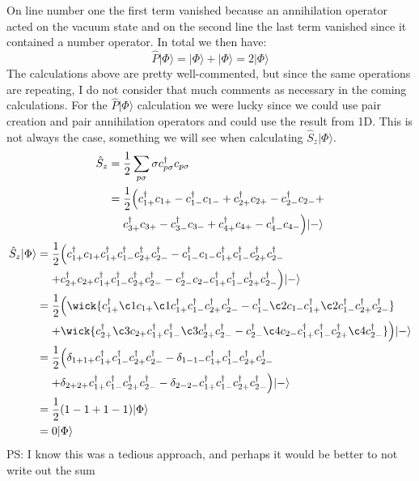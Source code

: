 \documentclass[norsk,a4paper,12pt]{article}
\begin{document}
On line number one the first term vanished because an annihilation operator acted on the vacuum state and on the second line the last term vanished since it contained a number operator. In total we then have:
\begin{equation}
\hat{P}|\Phi\rangle=|\Phi\rangle+|\Phi\rangle=2|\Phi\rangle
\end{equation}
The calculations above are pretty well-commented, but since the same operations are repeating, I do not consider that much comments as necessary in the coming calculations. For the $\hat{P}|\Phi\rangle$ calculation we were lucky since we could use pair creation and pair annihilation operators and could use the result from 1D. This is not always the case, something we will see when calculating $\hat{S}_z|\Phi\rangle$.
\begin{align*}
\hat{S}_z&=\frac{1}{2}\sum_{p\sigma}\sigma c_{p\sigma}^{\dagger}c_{p\sigma}\\
&=\frac{1}{2}\Big(c_{1+}^{\dagger}c_{1+}-c_{1-}^{\dagger}c_{1-}+c_{2+}^{\dagger}c_{2+}-c_{2-}^{\dagger}c_{2-}+\notag\\
&\mathrel{\phantom{=}}c_{3+}^{\dagger}c_{3+}-c_{3-}^{\dagger}c_{3-}+c_{4+}^{\dagger}c_{4+}-c_{4-}^{\dagger}c_{4-}\Big)|-\rangle
\end{align*}
\begin{align}
\hat{S}_z|\Phi\rangle
&=\frac{1}{2}\Big(c_{1+}^{\dagger}c_{1+}c_{1+}^{\dagger}c_{1-}^{\dagger}c_{2+}^{\dagger}c_{2-}^{\dagger}-c_{1-}^{\dagger}c_{1-}c_{1+}^{\dagger}c_{1-}^{\dagger}c_{2+}^{\dagger}c_{2-}^{\dagger}\notag\\
&\mathrel{\phantom{=}}+c_{2+}^{\dagger}c_{2+}c_{1+}^{\dagger}c_{1-}^{\dagger}c_{2+}^{\dagger}c_{2-}^{\dagger}-c_{2-}^{\dagger}c_{2-}c_{1+}^{\dagger}c_{1-}^{\dagger}c_{2+}^{\dagger}c_{2-}^{\dagger}\Big)|-\rangle\notag\\
&=\frac{1}{2}\Big(\wick{c_{1+}^{\dagger}\c1 c_{1+}\c1 c_{1+}^{\dagger}c_{1-}^{\dagger}c_{2+}^{\dagger}c_{2-}^{\dagger}-c_{1-}^{\dagger}\c2 c_{1-}c_{1+}^{\dagger}\c2 c_{1-}^{\dagger}c_{2+}^{\dagger}c_{2-}^{\dagger}}\notag\\
&\mathrel{\phantom{=}}+\wick{c_{2+}^{\dagger}\c3 c_{2+}c_{1+}^{\dagger}c_{1-}^{\dagger}\c3 c_{2+}^{\dagger}c_{2-}^{\dagger}-c_{2-}^{\dagger}\c4 c_{2-}c_{1+}^{\dagger}c_{1-}^{\dagger}c_{2+}^{\dagger}\c4 c_{2-}^{\dagger}}\Big)|-\rangle\notag\\
&=\frac{1}{2}\Big(\delta_{1+1+}c_{1+}^{\dagger}c_{1-}^{\dagger}c_{2+}^{\dagger}c_{2-}^{\dagger}-\delta_{1-1-}c_{1+}^{\dagger}c_{1-}^{\dagger}c_{2+}^{\dagger}c_{2-}^{\dagger}\notag\\
&\mathrel{\phantom{=}}+\delta_{2+2+}c_{1+}^{\dagger}c_{1-}^{\dagger}c_{2+}^{\dagger}c_{2-}^{\dagger}-\delta_{2-2-}c_{1+}^{\dagger}c_{1-}^{\dagger}c_{2+}^{\dagger}c_{2-}^{\dagger}\Big)|-\rangle\notag\\
&=\frac{1}{2}(1-1+1-1)|\Phi\rangle\notag\\
&=0|\Phi\rangle
\end{align}
PS: I know this was a tedious approach, and perhaps it would be better to not write out the sum
\end{document}
